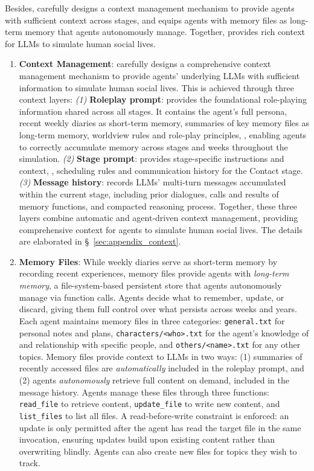 Besides, \method carefully designs a context management mechanism to provide agents with sufficient context across stages, and equips agents with memory files as long-term memory that agents autonomously manage.
Together, \method provides rich context for LLMs to simulate human social lives.

\begin{enumerate}
    
    \item \textbf{Context Management}:
    \method carefully designs a comprehensive context management mechanism to provide agents' underlying LLMs with sufficient information to simulate human social lives.
    This is achieved through three context layers:
    \textit{(1)} \textbf{Roleplay prompt}: provides the foundational role-playing information shared across all stages.
    It contains the agent's full persona, recent weekly diaries as short-term memory, summaries of key memory files as long-term memory, worldview rules and role-play principles, \etc,
    enabling agents to correctly accumulate memory across stages and weeks throughout the simulation.
    \textit{(2)} \textbf{Stage prompt}: provides stage-specific instructions and context, \eg, scheduling rules and communication history  for the Contact stage.
    \textit{(3)} \textbf{Message history}: records LLMs' multi-turn messages accumulated within the current stage, including prior dialogues, calls and results of memory functions, and compacted reasoning process.
    Together, these three layers combine automatic and agent-driven context management, providing comprehensive context for agents to simulate human social lives.
    The details are elaborated in \S~\ref{sec:appendix_context}.

    \item \textbf{Memory Files}:
    While weekly diaries serve as short-term memory by recording recent experiences, memory files provide agents with \textit{long-term memory}, a file-system-based persistent store that agents autonomously manage via function calls.
    Agents decide what to remember, update, or discard, giving them full control over what persists across weeks and years.
    Each agent maintains memory files in three categories:
    \texttt{general.txt} for personal notes and plans,
    \texttt{characters/<who>.txt} for the agent's knowledge of and relationship with specific people,
    and \texttt{others/<name>.txt} for any other topics.
    Memory files provide context to LLMs in two ways: (1)
    summaries of recently accessed files are \textit{automatically} included in the roleplay prompt, 
    and (2) agents \textit{autonomously} retrieve full content on demand, included in the message history.
    Agents manage these files through three functions: \texttt{read\_file} to retrieve content, \texttt{update\_file} to write new content, and \texttt{list\_files} to list all files.
    A read-before-write constraint is enforced: an update is only permitted after the agent has read the target file in the same invocation, ensuring updates build upon existing content rather than overwriting blindly.
    Agents can also create new files for topics they wish to track.
    
    
    \end{enumerate}
